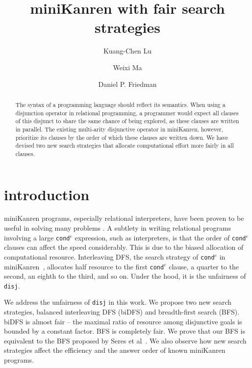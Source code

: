 \documentclass[format=acmlarge, review=true, authordraft=true]{acmart}
\title{miniKanren with fair search strategies}
\author{Kuang-Chen Lu}
\affiliation{Indiana University}
\author{Weixi Ma}
\affiliation{Indiana University}
\author{Daniel P. Friedman}
\affiliation{Indiana University}
\newcommand{\conde}{\texttt{cond$^e$} }
\begin{document}
\begin{abstract}

The syntax of a programming language should reflect its semantics. When using a
disjunction operator in relational programming, a programmer would expect all
clauses of this disjunct to share the same chance of being explored, as
these clauses are written in parallel. The existing multi-arity disjunctive
operator in miniKanren, however, prioritize its clauses by the order of which
these clauses are written down. We have devised two new search strategies that
allocate computational effort more fairly in all clauses.

\end{abstract}

\maketitle

\section{introduction}

miniKanren programs, especially relational interpreters, have been proven to be useful in solving many problems \citep{byrd2017unified}. A subtlety in writing relational programs involving a large \conde expression, such as interpreters, is that the order of \conde clauses can affect the speed considerably. This is due to the biased allocation of computational resource.
Interleaving DFS, the search strategy of \conde in miniKanren~\citep{friedman_reasoned_2018}, allocates half resource to the first \conde clause, a quarter to the second, an eighth to the third, and so on. Under the hood, it is the unfairness of \texttt{disj}.

We address the unfairness of \texttt{disj} in this work. We propose two new search strategies, balanced interleaving DFS (biDFS) and breadth-first search (BFS). biDFS is almost fair -- the maximal ratio of resource among disjunctive goals is bounded by a constant factor. BFS is completely fair. We prove that our BFS is equivalent to the BFS proposed by Seres et al~\citep{seres1999algebra}. We also observe how new search strategies affect the efficiency and the answer order of known miniKanren programs.
\end{document}
